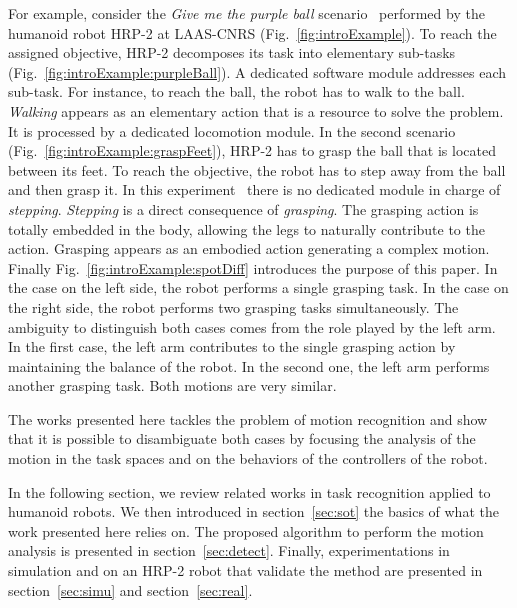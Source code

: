 \documentclass[letterpaper, 10pt, conference]{ieeeconf}      %
\begin{document}
For example, consider the \emph{Give me the purple ball} scenario~\cite{yoshida07}
performed by the humanoid robot HRP-2 at LAAS-CNRS (Fig.~\ref{fig:introExample}). To reach the assigned
objective, HRP-2 decomposes its task into elementary sub-tasks
(Fig.~\ref{fig:introExample:purpleBall}). A dedicated software module addresses each
sub-task. For instance,
to reach the ball, the robot has to walk to the ball. \emph{Walking} appears as an
elementary action that is a resource to solve the problem. It is processed by a
dedicated locomotion module. In the second scenario (Fig.~\ref{fig:introExample:graspFeet}),
HRP-2 has to grasp the ball that is located between its feet. To reach the
objective, the robot has to step away from the ball and then grasp it. In this
experiment~\cite{kanoun10} there is no dedicated module in charge of \emph{stepping}. \emph{Stepping} is
a direct consequence of \emph{grasping}. The grasping action is totally embedded in
the body, allowing the legs to naturally contribute to the action. Grasping
appears as an embodied action generating a complex motion. Finally Fig.~\ref{fig:introExample:spotDiff}
introduces the purpose of this paper. In the case on the left side, the robot
performs a single grasping task. In the case on the right side, the robot
performs two grasping tasks simultaneously. The ambiguity to distinguish both
cases comes from the role played by the left arm. In the first case, the left
arm contributes to the single grasping action by maintaining the balance of the
robot. In the second one, the left arm performs another grasping task. Both
motions are very similar. 

The works presented here tackles the problem of motion recognition and 
show that it is possible to disambiguate both cases by focusing
the analysis of the motion in the task spaces and on
the behaviors of the controllers of the robot.

In the following section, we review related works in task recognition applied
to humanoid robots. We then introduced in section~\ref{sec:sot} the basics of what the work presented here
relies on. The proposed algorithm to perform the motion analysis is presented in section~\ref{sec:detect}.
Finally, experimentations in simulation and on an HRP-2 robot that validate the method are presented in 
section~\ref{sec:simu} and section~\ref{sec:real}.
\end{document}
